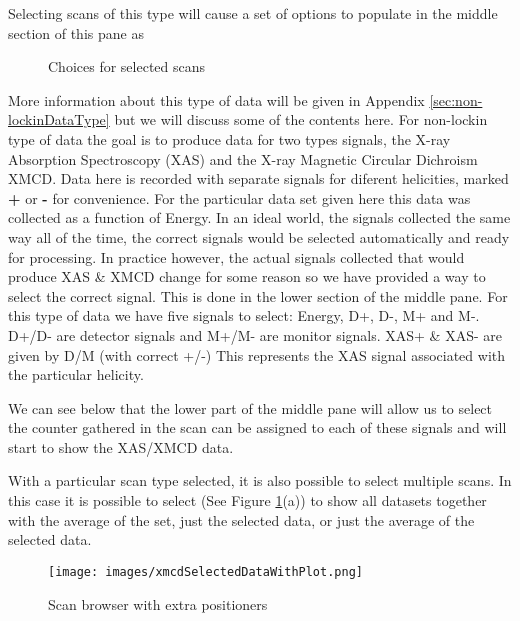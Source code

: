 \documentclass[12pt,letterpaper, openany]{book}
\begin{document}
Selecting scans of this type will cause a set of options to populate in the
middle section of this pane as 

\begin{figure}[htp]

\centering
{}


\caption {Choices for selected scans}
\label{fig:selectionChoice}
\end{figure}

More information about this type of data will be given in Appendix
\ref{sec:non-lockinDataType} but we will discuss some of the contents here. For
non-lockin type of data the goal is to produce data for two types signals, the
X-ray Absorption Spectroscopy (XAS) and the X-ray Magnetic Circular Dichroism
XMCD.
Data here is recorded with separate signals for diferent helicities, marked
\textbf{+} or \textbf{-} for convenience.  For the particular data set given
here this data was collected as a function of Energy.  In an ideal world, the
signals collected the same way all of the time, the correct signals would be
selected automatically and ready for processing.  In practice however, the
actual signals collected that would produce XAS \& XMCD change for some reason
so we have provided a way to select the correct signal.  This is done in the
lower section of the middle pane.  For this type of data we have five signals to
select: Energy, D+, D-, M+ and M-.  D+/D- are detector signals and M+/M- are
monitor signals.  XAS+ \& XAS- are given by D/M (with correct +/-)  This
represents the XAS signal associated with the particular helicity.

We can see below that the lower part of the middle pane will allow us to select
the counter gathered in the scan can be assigned to each of these signals and
will start to show the XAS/XMCD data.

With a particular scan type selected, it is also possible to select multiple
scans.  In this case it is possible to select (See Figure
\ref{fig:selectionChoice}(a)) to show all datasets together with the average of
the set, just the selected data, or just the average of the selected data.
\begin{figure}
\texttt{[image: images/xmcdSelectedDataWithPlot.png]}
\caption {Scan browser with extra positioners}
\label{fig:selectedScanBrowser}
\end{figure}
\end{document}
